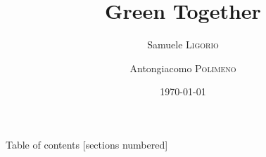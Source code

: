 \documentclass[xcolor={x11names,table}]{beamer}
\title{\vspace*{2.5cm}Green Together}
\date{\today}
\author{Samuele \textsc{Ligorio} \and Antongiacomo \textsc{Polimeno}}
\institute{Università Degli Studi Di Milano}
\begin{document}
\maketitle

\begin{frame}{Table of contents}
  [sections numbered]
  \tableofcontents
\end{frame}



\end{document}
